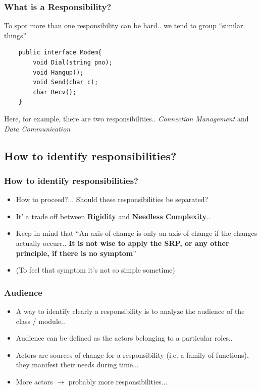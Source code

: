 \documentclass{beamer}
\begin{document}
\begin{frame}[containsverbatim]
	\frametitle{What is a Responsibility?}
	To spot more than one responsibility can be hard.. we tend to group ``similar things'' \\
	\begin{lstlisting}
	public interface Modem{
		void Dial(string pno);
		void Hangup();
		void Send(char c);
		char Recv();
	}
	\end{lstlisting}
	Here, for example, there are two responsibilities.. \textit{Connection Management} and \textit{Data Communication}
\end{frame}

\subsection{How to identify responsibilities?}
\begin{frame}
  \frametitle{How to identify responsibilities?}
  \begin{itemize}
	\item<+-> How to proceed?... Should these responsibilities be separated?
	\item<+-> It' a trade off between \textbf{Rigidity} and \textbf{Needless Complexity}..
	\item<+-> Keep in mind that ``An axis of change is only an axis of change if the changes
actually occurr.. \textbf{It is not wise to apply the SRP, or any other principle, if there is no symptom}''
	\item<+-> (To feel that symptom it's not so simple sometime)
   \end{itemize}
\end{frame}

\begin{frame}
  \frametitle{Audience}
  \begin{itemize}
	\item<+-> A way to identify clearly a responsibility is to analyze the audience of the class / module..
	\item<+-> Audience can be defined as the actors belonging to a particular roles.. 
	\item<+-> Actors are sources of change for a responsibility (i.e. a family of functions), they manifest their needs during time...
	\item<+-> More actors $ \rightarrow $ probably more responsibilities... 
   \end{itemize}
\end{frame}
\end{document}
